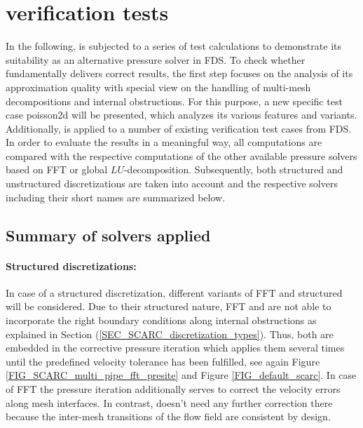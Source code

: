 \section{\scarc{} verification tests}
\label{SEC_SCARC_verification}

In the following, \scarc{} is subjected to a series of test calculations to demonstrate its suitability as an alternative pressure solver in FDS.  To check whether \scarc{} fundamentally delivers correct results, 
the first step focuses on the analysis of its approximation quality with special view on the handling of multi-mesh decompositions and internal obstructions.
%
For this purpose, a new \scarc{} specific test case {\ct poisson2d} will be presented, which analyzes its various features and variants.
Additionally, \scarc{} is applied to a number of existing verification test cases from FDS.
In order to evaluate the results in a meaningful way, all \scarc{} computations are compared with the respective computations of the other available pressure solvers based on FFT or global $LU$-decomposition. Subsequently, both structured and unstructured discretizations are taken into account and the respective solvers including their short names are summarized below.

\subsection{Summary of solvers applied}

%
\paragraph{Structured discretizations:} 
In case of a structured discretization, different variants of FFT and structured \scarc{} will be considered.
Due to their structured nature, FFT and \scarc{} are not able to incorporate the right boundary conditions along internal obstructions 
as explained in Section (\ref{SEC_SCARC_discretization_types}). 
Thus, both are embedded in the corrective pressure iteration which applies them several times until the predefined velocity tolerance has been fulfilled, see again Figure \ref{FIG_SCARC_multi_pipe_fft_presite} and Figure \ref{FIG_default_scarc}.
In case of FFT the pressure iteration additionally serves to correct the velocity errors along mesh interfaces. In contrast, \scarc{} doesn't need any further correction there because the inter-mesh transitions of the flow field are consistent by design. 

